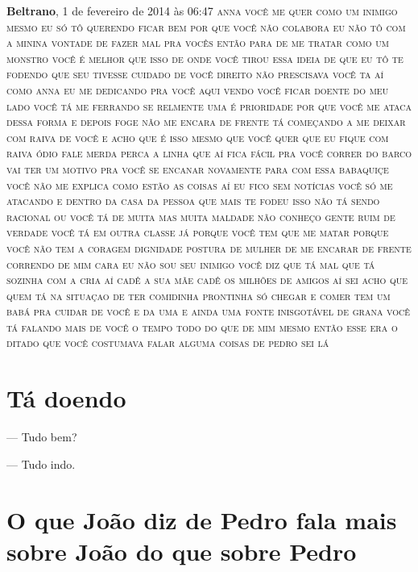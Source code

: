 {\textbf{Beltrano}, 1 de fevereiro de 2014 às 06:47 \textsc{anna você me quer
como um inimigo mesmo eu só tô querendo ficar bem por que você não
colabora eu não tô com a minina vontade de fazer mal pra vocês então
para de me tratar como um monstro você é melhor que isso de onde você
tirou essa ideia de que eu tô te fodendo que seu tivesse cuidado de você
direito não prescisava você ta aí como anna eu me dedicando pra você
aqui vendo você ficar doente do meu lado você tá me ferrando se relmente
uma é prioridade por que você me ataca dessa forma e depois foge não me
encara de frente tá começando a me deixar com raiva de você e acho que é
isso mesmo que você quer que eu fique com raiva ódio fale merda perca a
linha que aí fica fácil pra você correr do barco vai ter um motivo pra
você se encanar novamente para com essa babaquiçe você não me explica
como estão as coisas aí eu fico sem notícias você só me atacando e
dentro da casa da pessoa que mais te fodeu isso não tá sendo racional ou
você tá de muita mas muita maldade não conheço gente ruim de verdade
você tá em outra classe já porque você tem que me matar porque você não
tem a coragem dignidade postura de mulher de me encarar de frente
correndo de mim cara eu não sou seu inimigo você diz que tá mal que tá
sozinha com a cria aí cadê a sua mãe cadê os milhões de amigos aí sei
acho que quem tá na situaçao de ter comidinha prontinha só chegar e
comer tem um babá pra cuidar de você e da uma e ainda uma fonte
inisgotável de grana você tá falando mais de você o tempo todo do que de
mim mesmo então esse era o ditado que você costumava falar alguma coisas
de pedro sei lá}
}

\chapter{Tá doendo}

{\parindent0pt
— Tudo bem?

— Tudo indo.}

\chapter{O que João diz de Pedro fala mais sobre João do que sobre Pedro}

